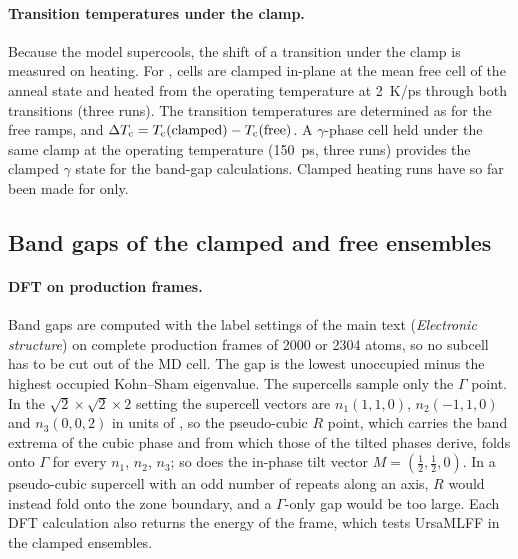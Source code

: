 \paragraph{Transition temperatures under the clamp.}
Because the model supercools, the shift of a transition under the clamp is
measured on heating. For \CsSnI{}, cells are clamped in-plane at the mean free
cell of the anneal state and heated from the operating temperature at
\SI{2}{K/ps} through both transitions (three runs). The transition temperatures
are determined as for the free ramps, and $\Delta T_\mathrm{c} = T_\mathrm{c}(\mathrm{clamped}) -
T_\mathrm{c}(\mathrm{free})$. A $\gamma$-phase cell held under the same clamp at the
operating temperature (\SI{150}{ps}, three runs) provides the clamped $\gamma$
state for the band-gap calculations. Clamped heating runs have so far been made for \CsSnI{} only.

\subsection{Band gaps of the clamped and free ensembles}
\label{si:gaps-protocol}

\paragraph{DFT on production frames.}
Band gaps are computed with the label settings of the main text (\emph{Electronic structure}) on
complete production frames of 2000 or 2304 atoms, so no subcell has to be cut
out of the MD cell. The gap is the lowest unoccupied minus the highest occupied
Kohn--Sham eigenvalue. The supercells sample only the $\Gamma$ point. In the
$\sqrt{2}\times\sqrt{2}\times2$ setting the supercell vectors are
$n_1(1,1,0)$, $n_2(-1,1,0)$ and $n_3(0,0,2)$ in units of \apc{}, so the
pseudo-cubic $R$ point, which carries the band extrema of the cubic phase and
from which those of the tilted phases derive, folds onto $\Gamma$ for every
$n_1$, $n_2$, $n_3$; so does the in-phase tilt vector $M=(\tfrac12,\tfrac12,0)$.
In a pseudo-cubic supercell with an odd number of repeats along an axis, $R$
would instead fold onto the zone boundary, and a $\Gamma$-only gap would be too
large. Each DFT calculation also returns the energy of the frame, which tests
UrsaMLFF in the clamped ensembles.


